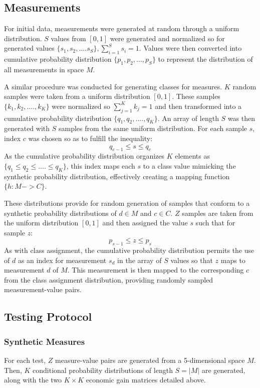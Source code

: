 \documentclass[10pt, conference]{IEEEtran}
\begin{document}
\subsection{Measurements}
For initial data, measurements were generated at random through a uniform distribution. $S$ values from $[0,1]$ were generated and normalized so for generated values $\{s_1,s_2,....s_S\}, \sum_{i=1}^Ss_i = 1$.  Values were then converted into cumulative probability distribution $\{p_1,p_2,...,p_S\}$ to represent the distribution of all measurements in space $M$. 

A similar procedure was conducted for generating classes for measures. $K$ random samples were taken from a uniform distribution $[0,1].$ These samples $\{k_1,k_2,....,k_K\}$ were normalized so $\sum_{j=1}^Kk_j=1$ and then transformed into a cumulative probability distribution $\{q_1,q_2,....,q_K\}$.  An array of length $S$ was then generated with $S$ samples from the same uniform distribution. For each sample $s$, index $c$ was chosen  so as to fulfill the inequality:
\begin{equation}
q_{c-1} \leq s \leq q_c 
\end{equation}
As the cumulative probability distribution organizes $K$ elements as $\{q_1 \leq q_2 \leq .... \leq q_K\}$, this index maps each $s$ to a class value mimicking the synthetic probability distribution, effectively creating a mapping function $\{h: M -> C\}.$

These distributions provide for random generation of samples that conform to a synthetic probability distributions of $d\in M$ and $c \in C.$ $Z$ samples are taken from the uniform distribution $[0,1]$ and then assigned the value $s$ such that for sample $z$:
\begin{equation}
p_{s-1} \leq z \leq p_s 
\end{equation}
As with class assignment, the cumulative probability distribution permits the use of $d$ as an index for measurement $s_d$ in the array of $S$ values so that $z$ maps to measurement $d$ of $M$. This measurement is then mapped to the corresponding $c$ from the class assignment distribution, providing randomly sampled measurement-value pairs. 
\subsection{Testing Protocol}
\subsubsection{Synthetic Measures}
For each test, $Z$ measure-value pairs are generated from a 5-dimensional space $M.$ Then, $K$ conditional probability distributions of length $S=|M|$ are generated, along with the two $K \times K$ economic gain matrices detailed above. 
\end{document}
